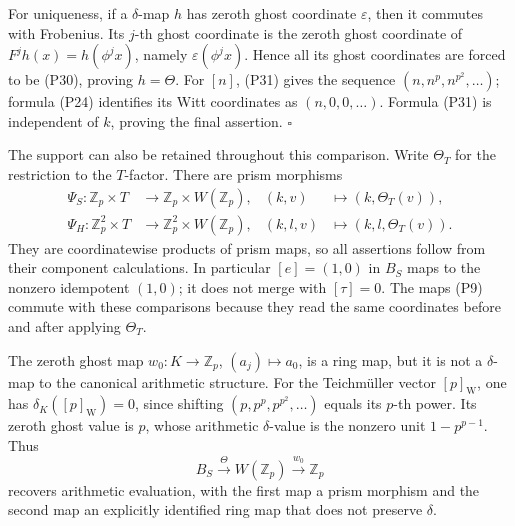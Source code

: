 \documentclass[
]{article}
\begin{document}
For uniqueness, if a \(\delta\)-map \(h\) has zeroth ghost coordinate
\(\varepsilon\), then it commutes with Frobenius. Its \(j\)-th ghost
coordinate is the zeroth ghost coordinate of \(F^jh(x)=h(\phi^jx)\),
namely \(\varepsilon(\phi^jx)\). Hence all its ghost coordinates are
forced to be (P30), proving \(h=\Theta\). For \([n]\), (P31) gives the
sequence \((n,n^p,n^{p^2},\ldots)\); formula (P24) identifies its Witt
coordinates as \((n,0,0,\ldots)\). Formula (P31) is independent of
\(k\), proving the final assertion. \(\square\)

The support can also be retained throughout this comparison. Write
\(\Theta_T\) for the restriction to the \(T\)-factor. There are prism
morphisms \[
\begin{aligned}
\Psi_S:\mathbb Z_p\times T&\longrightarrow\mathbb Z_p\times W(\mathbb Z_p),
&(k,v)&\longmapsto(k,\Theta_T(v)),\\
\Psi_H:\mathbb Z_p^2\times T&\longrightarrow\mathbb Z_p^2\times W(\mathbb Z_p),
&(k,l,v)&\longmapsto(k,l,\Theta_T(v)).
\end{aligned}
\tag{P32}
\] They are coordinatewise products of prism maps, so all assertions
follow from their component calculations. In particular \([e]=(1,0)\) in
\(B_S\) maps to the nonzero idempotent \((1,0)\); it does not merge with
\([\tau]=0\). The maps (P9) commute with these comparisons because they
read the same coordinates before and after applying \(\Theta_T\).

The zeroth ghost map \(w_0:K\to\mathbb Z_p\), \((a_j)\mapsto a_0\), is a
ring map, but it is not a \(\delta\)-map to the canonical arithmetic
structure. For the Teichmüller vector \([p]_{\mathrm W}\), one has
\(\delta_K([p]_{\mathrm W})=0\), since shifting
\((p,p^p,p^{p^2},\ldots)\) equals its \(p\)-th power. Its zeroth ghost
value is \(p\), whose arithmetic \(\delta\)-value is the nonzero unit
\(1-p^{p-1}\). Thus \[
B_S\xrightarrow{\Theta}W(\mathbb Z_p)\xrightarrow{w_0}\mathbb Z_p
\tag{P33}
\] recovers arithmetic evaluation, with the first map a prism morphism
and the second map an explicitly identified ring map that does not
preserve \(\delta\).
\end{document}
